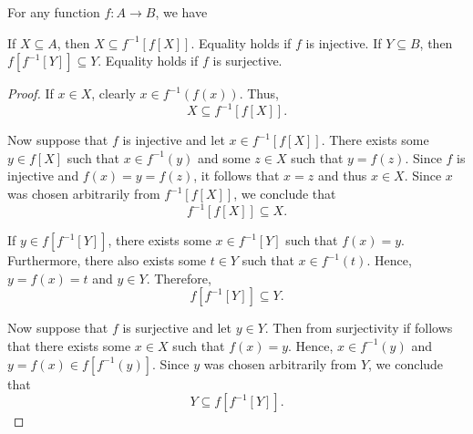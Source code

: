 \begin{proposition}\label{thm:function_image_preimage_composition}
  For any function \( f: A \to B \), we have
  \begin{thmenum}
     If \( X \subseteq A \), then \( X \subseteq f^{-1}[f[X]] \). Equality holds if \( f \) is injective.
     If \( Y \subseteq B \), then \( f[f^{-1}[Y]] \subseteq Y \). Equality holds if \( f \) is surjective.
  \end{thmenum}
\end{proposition}
\begin{proof}
   If \( x \in X \), clearly \( x \in f^{-1}(f(x)) \). Thus,
  \begin{equation*}
    X \subseteq f^{-1}[f[X]].
  \end{equation*}

  Now suppose that \( f \) is injective and let \( x \in f^{-1}[f[X]] \). There exists some \( y \in f[X] \) such that \( x \in f^{-1}(y) \) and some \( z \in X \) such that \( y = f(z) \). Since \( f \) is injective and \( f(x) = y = f(z) \), it follows that \( x = z \) and thus \( x \in X \). Since \( x \) was chosen arbitrarily from \( f^{-1}[f[X]] \), we conclude that
  \begin{equation*}
    f^{-1}[f[X]] \subseteq X.
  \end{equation*}

   If \( y \in f[f^{-1}[Y]] \), there exists some \( x \in f^{-1}[Y] \) such that \( f(x) = y \). Furthermore, there also exists some \( t \in Y \) such that \( x \in f^{-1}(t) \). Hence, \( y = f(x) = t \) and \( y \in Y \). Therefore,
  \begin{equation*}
    f[f^{-1}[Y]] \subseteq Y.
  \end{equation*}

  Now suppose that \( f \) is surjective and let \( y \in Y \). Then from surjectivity if follows that there exists some \( x \in X \) such that \( f(x) = y \). Hence, \( x \in f^{-1}(y) \) and \( y = f(x) \in f[f^{-1}(y)] \). Since \( y \) was chosen arbitrarily from \( Y \), we conclude that
  \begin{equation*}
    Y \subseteq f[f^{-1}[Y]].
  \end{equation*}
\end{proof}

